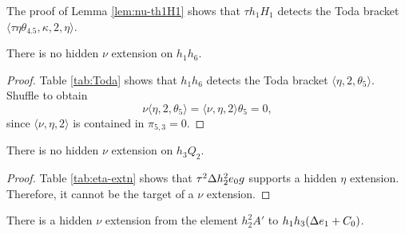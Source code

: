 \begin{remark}
\label{rem:tetatheta4.5,kappa,2,eta}
The proof of Lemma \ref{lem:nu-th1H1} shows that
$\tau h_1 H_1$ detects 
the Toda bracket
$\langle \tau \eta \theta_{4.5}, \kappa, 2, \eta \rangle$.
\end{remark}

\begin{lemma}
\label{lem:nu-h1h6}
There is no hidden $\nu$ extension on $h_1 h_6$.
\end{lemma}

\begin{proof}
Table \ref{tab:Toda} shows that $h_1 h_6$ detects the Toda bracket
$\langle \eta, 2, \theta_5 \rangle$.  Shuffle to obtain
\[
\nu \langle \eta, 2, \theta_5 \rangle =
\langle \nu, \eta, 2 \rangle \theta_5 = 0,
\]
since $\langle \nu, \eta, 2 \rangle$ is contained in $\pi_{5,3} = 0$.
\end{proof}

\begin{lemma}
\label{lem:nu-h3Q2}
There is no hidden $\nu$ extension on $h_3 Q_2$.
\end{lemma}

\begin{proof}
Table \ref{tab:eta-extn} shows that 
$\tau^2 \Delta h_2^2 e_0 g$ supports a hidden $\eta$ extension.
Therefore, it cannot be the target of a $\nu$ extension.
\end{proof}

\begin{lemma}
\label{lem:nu-h2^2A'}
There is a hidden $\nu$ extension from
the element $h_2^2 A'$ to $h_1 h_3 (\Delta e_1 + C_0)$.
\end{lemma}

